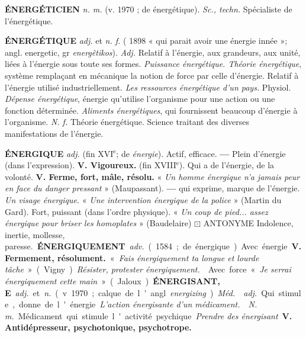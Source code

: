 \vspace{0.24cm}
{\footnotesize 
{\bf ÉNERGÉTICIEN} {\it n. m.} (v. 1970 ; de énergétique). {\it Sc., techn.} Spécialiste de l'énergétique.

{\bf ÉNERGÉTIQUE} {\it adj.} et {\it n. f.} ( 1898 « qui parait avoir une énergie innée »; angl. energetic, gr {\it energêtikos}).  {\it Adj.} Relatif à l'énergie, aux grandeurs, aux unité, liées à l'énergie sous toute ses formes. {\it Puissance énergétique. Théorie énergétique}, système remplaçant en mécanique la notion de force par celle d'énergie. \lb Relatif à l'énergie utilisé industriellement. {\it Les ressources énergétique d'un pays.} \lb Physiol. {\it Dépense énergétique}, énergie qu'utilise l'organisme pour une action ou une fonction déterminée. {\it Aliments énergétiques}, qui fournissent beaucoup d'énergie à l'organisme.  {\it N. f.} Théorie énergétique. Science traitant des diverses manifestations de l'énergie.

{\bf ÉNERGIQUE} {\it adj.} (fin {\footnotesize XVI}$^\text{e}$; de {\it énergie}).  Actif, efficace.  {\bf —} Plein d'énergie (dans l'expression). {\bf V. Vigoureux.} (fin {\footnotesize XVIII}$^\text{e}$). Qui a de l'énergie, de la volonté. {\bf V. Ferme, fort, mâle, résolu.} « {\it Un homme énergique n'a jamais peur en face du danger pressant} » ({\sc Maupassant}). {\bf —} qui exprime, marque de l'énergie. {\it Un visage énergique.} « {\it Une intervention énergique de la police} » ({\sc Martin du Gard}). \lb Fort, puissant (dans l'ordre physique). « {\it Un coup de pied... assez énergique pour briser les homoplates} » ({\sc Baudelaire}) $\boxdot$ {\sc ANTONYME} \si{Indolence, inertie, mollesse, paresse.}

{\bf ÉNERGIQUEMENT} {\it adv.} (1584; de énergique) Avec énergie. {\bf V. Fermement, résolument.} « {\it Fais énergiquement ta longue et lourde tâche} » ({\sc Vigny}). {\it Résister, protester énergiquement.} \lb Avec force « {\it Je serrai énergiquement cette main} » ({\sc Jaloux}).

{\bf ÉNERGISANT, E} {\it adj.} et {\it n.} (v. 1970 ; calque de l'angl. {\it energizing}). {\it Méd.}  {\it adj.} Qui stimule, donne de l'énergie. {\it L'action énergisante d'un médicament.}  {\it N. m.} Médicament qui stimule l'activité psychique. {\it Prendre des énergisant}. {\bf V. Antidépresseur, psychotonique, psychotrope.}
}
\vspace{0.31cm}

